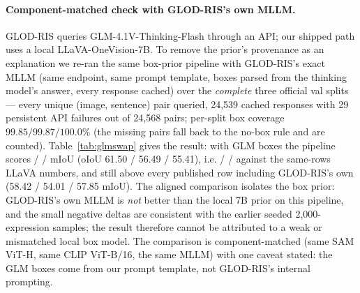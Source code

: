 \paragraph{Component-matched check with GLOD-RIS's own MLLM.}
GLOD-RIS queries GLM-4.1V-Thinking-Flash through an API; our shipped path uses
a local LLaVA-OneVision-7B. To remove the prior's provenance as an explanation
we re-ran the same box-prior pipeline with GLOD-RIS's exact MLLM (same
endpoint, same prompt template, boxes parsed from the thinking model's answer,
every response cached) over the \emph{complete} three official val splits ---
every unique (image, sentence) pair queried, 24{,}539 cached responses with 29
persistent API failures out of 24{,}568 pairs; per-split box coverage
$99.85/99.87/100.0\%$ (the missing pairs fall back to the no-box rule and are
counted). Table~\ref{tab:glmswap} gives the result: with GLM boxes the pipeline
scores \glmRefcocoMIoU{} / \glmRefcocoplusMIoU{} / \glmRefcocogMIoU{} mIoU
(oIoU 61.50 / 56.49 / 55.41), i.e. \glmRefcocoDelta{} /
\glmRefcocoplusDelta{} / \glmRefcocogDelta{} against the same-rows LLaVA
numbers, and still above every published row including GLOD-RIS's own
(58.42 / 54.01 / 57.85 mIoU). The aligned comparison isolates the box prior:
GLOD-RIS's own MLLM is \emph{not} better than the local 7B prior on this
pipeline, and the small negative deltas are consistent with the earlier seeded
2{,}000-expression samples; the result therefore cannot be attributed to a
weak or mismatched local box model. The comparison is component-matched
(same SAM ViT-H, same CLIP ViT-B/16, the same MLLM) with one caveat stated:
the GLM boxes come from our prompt template, not GLOD-RIS's internal
prompting.

\begin{table}[t]\centering\small
\caption{Component-matched MLLM swap on the complete official val splits
(identical rows per column pair): the shipped path with GLOD-RIS's
GLM-4.1V boxes vs the local LLaVA boxes.}\label{tab:glmswap}

\end{table}

\begin{table}[t]\centering\small
\caption{gRefCOCO (GRES) val, official cIoU/gIoU protocol. Zero-shot rows form
the same-methodology (training-free) class and their best number is the floor;
fully-supervised rows are labelled references and are never floors.
$^\dagger$All base components are frozen off the shelf (released scorer, VLM,
SAM, existence probes). The shipped DINO-free rule fits only its selector
configuration on held-out rows carved from gRefCOCO \emph{train} (the
original studies plus the post-correction 802-configuration search) and is
frozen before its single full-val pass. The detector-bearing rule and the
declared-trained recipe are \emph{not} shipped: the directive removes
GroundingDINO, and the recipe's part pool is detector-derived
(\texttt{transfer\_wall.json}).}
\label{tab:gres}

\end{table}


